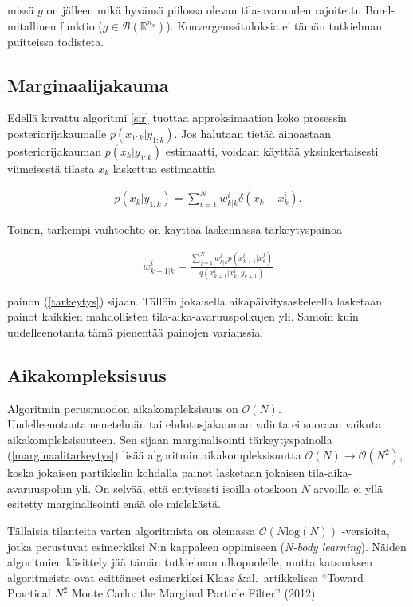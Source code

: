 \documentclass[
  12pt,
  a4paper, twoside]{book}
\begin{document}
missä \(g\) on jälleen mikä hyvänsä piilossa olevan tila-avaruuden rajoitettu Borel-mitallinen funktio (\(g \in \mathcal{B}(\mathbb{R}^{n_x})\)). Konvergenssituloksia ei tämän tutkielman puitteissa todisteta.

\subsection{Marginaalijakauma}

Edellä kuvattu algoritmi \ref{sir} tuottaa approksimaation koko prosessin posteriorijakaumalle \(p(x_{1:k}|y_{1:k})\). Jos halutaan tietää ainoastaan posteriorijakauman \(p(x_k|y_{1:k})\) estimaatti, voidaan käyttää yksinkertaisesti viimeisestä tilasta \(x_k\) laskettua estimaattia

\begin{align}
\hat{p}(x_{k}|y_{1:k})=\sum_{i=1}^{N}w_{k|k}^i \delta(x_{k}-x_{k}^i).
\end{align}

Toinen, tarkempi vaihtoehto on käyttää laskennassa tärkeytyspainoa

\begin{align}\label{marginaalitarkeytys}
w_{k+1|k}^i=\frac{\sum_{j=1}^{N}w_{k|k}^jp(x_{k+1}^i|x_k^j)}{q(x_{k+1}^i|x_k^i,y_{k+1})}
\end{align}

\noindent painon (\ref{tarkeytys}) sijaan. Tällöin jokaisella aikapäivitysaskeleella lasketaan painot kaikkien mahdollisten tila-aika-avaruuspolkujen yli. Samoin kuin uudelleenotanta tämä pienentää painojen varianssia.

\subsection{Aikakompleksisuus}

Algoritmin perusmuodon aikakompleksisuus on \(\mathcal{O}(N)\). Uudelleenotantamenetelmän tai ehdotusjakauman valinta ei suoraan vaikuta aikakompleksisuuteen. Sen sijaan marginalisointi tärkeytyspainolla (\ref{marginaalitarkeytys}) lisää algoritmin aikakompleksisuutta \(\mathcal{O}(N)\rightarrow\mathcal{O}(N^2)\), koska jokaisen partikkelin kohdalla painot lasketaan jokaisen tila-aika-avaruuspolun yli. On selvää, että erityisesti isoilla otoskoon \(N\) arvoilla ei yllä esitetty marginalisointi enää ole mielekästä.

Tällaisia tilanteita varten algoritmista on olemassa \(\mathcal{O}(N\text{log}(N))\) -versioita, jotka perustuvat esimerkiksi N:n kappaleen oppimiseen (\emph{N-body learning}). Näiden algoritmien käsittely jää tämän tutkielman ulkopuolelle, mutta katsauksen algoritmeista ovat esittäneet esimerkiksi Klaas \&al.~artikkelissa ``Toward Practical \(N^2\) Monte Carlo: the Marginal Particle Filter'' (2012).
\end{document}
